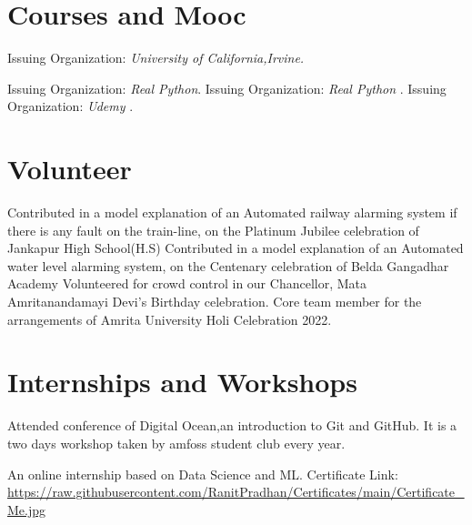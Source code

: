 \documentclass[11pt,a4paper,sans]{moderncv}        %
\begin{document}
\section{Courses and Mooc}
{Issuing Organization: \textit{University of California,Irvine.}
}

{Issuing Organization: \textit{Real Python}.
}
{Issuing Organization: \textit{Real Python} .
}
{Issuing Organization: \textit{Udemy} .
}

\section{Volunteer}
{Contributed in a model explanation of an Automated railway alarming system if there is any fault on the train-line, on the  
Platinum Jubilee celebration of Jankapur High School(H.S)}
{Contributed in a model explanation of an Automated water level alarming system, on the Centenary celebration of Belda Gangadhar Academy}
{Volunteered for crowd control in our Chancellor, Mata Amritanandamayi Devi's Birthday celebration.}
{Core team member for the arrangements of Amrita University Holi Celebration 2022.}

\section{Internships and Workshops}
{Attended conference of Digital Ocean,an introduction to Git and GitHub. It is a two days workshop taken by amfoss student club every year.}

{An online internship based on Data Science and ML. {\newline}
Certificate Link: {\newline}
\url{https://raw.githubusercontent.com/RanitPradhan/Certificates/main/Certificate_Me.jpg }}{}
\end{document}
